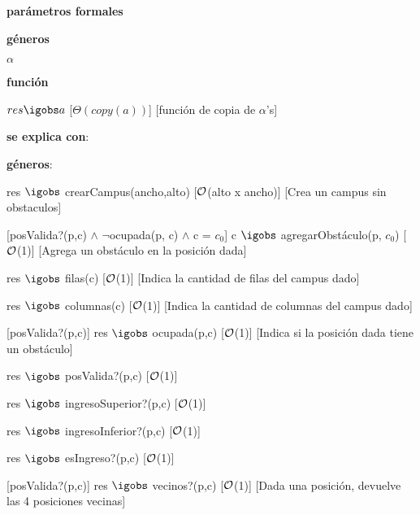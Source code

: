 \begin{Interfaz}
	\textbf{parámetros formales}\parindent\\
	\parbox{1.7cm}{\textbf{géneros}} $\alpha$\\
	\parbox[t]{1.7cm}{\textbf{función}}\parbox[t]{\textwidth-2\parindent-1.7cm}{%
	    	{$res \igobs a$}
		[$\Theta(copy(a))$]
		[función de copia de $\alpha$'s]
	}
  
	\textbf{se explica con}: 
	
	\textbf{géneros}: 
	

	{res $\igobs$ crearCampus(ancho,alto)}
	[$\mathcal{O}$(alto x ancho)]
	[Crea un campus sin obstaculos]
	
	[posValida?(p,c) $\land$ $\neg$ocupada(p, c) $\land$ c = $c_{0}$]
	{c $\igobs$ agregarObstáculo(p, $c_{0}$)}
	[$\mathcal{O}$(1)]
	[Agrega un obstáculo en la posición dada]
	
	{res $\igobs$ filas(c)}
	[$\mathcal{O}$(1)]
	[Indica la cantidad de filas del campus dado]
	
	{res $\igobs$ columnas(c)}
	[$\mathcal{O}$(1)]
	[Indica la cantidad de columnas del campus dado]	
	
	[posValida?(p,c)]
	{res $\igobs$ ocupada(p,c)}
	[$\mathcal{O}$(1)]
	[Indica si la posición dada tiene un obstáculo]
	
	{res $\igobs$ posValida?(p,c)}
	[$\mathcal{O}$(1)]
	
	{res $\igobs$ ingresoSuperior?(p,c)}
	[$\mathcal{O}$(1)]
	
	{res $\igobs$ ingresoInferior?(p,c)}
	[$\mathcal{O}$(1)]
	
	{res $\igobs$ esIngreso?(p,c)}
	[$\mathcal{O}$(1)]
	
	[posValida?(p,c)]
	{res $\igobs$ vecinos?(p,c)}
	[$\mathcal{O}$(1)]
	[Dada una posición, devuelve las 4 posiciones vecinas]
		

\end{Interfaz}
